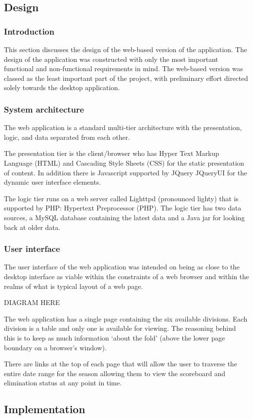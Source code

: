 \subsection{Design}

\subsubsection{Introduction}

This section discusses the design of the web-based version of the application.
The design of the application was constructed with only the most important
functional and non-functional requirements in mind. The web-based version was
classed as the least important part of the project, with preliminary effort
directed solely towards the desktop application.

\subsubsection{System architecture}

The web application is a standard multi-tier architecture with the presentation,
logic, and data separated from each other.

The presentation tier is the client/browser who has Hyper Text Markup Language
(HTML) and Cascading Style Sheets (CSS) for the static presentation of content.
In addition there is Javascript supported by JQuery JQueryUI for the dynamic
user interface elements.

The logic tier runs on a web server called Lighttpd (pronounced lighty) that is
supported by PHP: Hypertext Preprocessor (PHP). The logic tier has two data
sources, a MySQL database containing the latest data and a Java jar for looking
back at older data.

\subsubsection{User interface}

The user interface of the web application was intended on being as close to the
desktop interface as viable within the constraints of a web browser and within
the realms of what is typical layout of a web page.

DIAGRAM HERE%

The web application has a single page containing the six available divisions.
Each division is a table and only one is available for viewing. The reasoning
behind this is to keep as much information `about the fold' (above the lower
page boundary on a browser's window).

There are links at the top of each page that will allow the user to traverse
the entire date range for the season allowing them to view the scoreboard and
elimination status at any point in time.

\subsection{Implementation}
